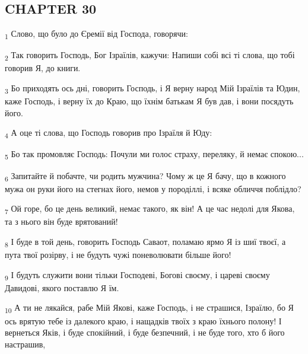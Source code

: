 \subsection{CHAPTER 30}
\begin{tcolorbox}
\textsubscript{1} Слово, що було до Єремії від Господа, говорячи:
\end{tcolorbox}
\begin{tcolorbox}
\textsubscript{2} Так говорить Господь, Бог Ізраїлів, кажучи: Напиши собі всі ті слова, що тобі говорив Я, до книги.
\end{tcolorbox}
\begin{tcolorbox}
\textsubscript{3} Бо приходять ось дні, говорить Господь, і Я верну народ Мій Ізраїлів та Юдин, каже Господь, і верну їх до Краю, що їхнім батькам Я був дав, і вони посядуть його.
\end{tcolorbox}
\begin{tcolorbox}
\textsubscript{4} А оце ті слова, що Господь говорив про Ізраїля й Юду:
\end{tcolorbox}
\begin{tcolorbox}
\textsubscript{5} Бо так промовляє Господь: Почули ми голос страху, переляку, й немає спокою...
\end{tcolorbox}
\begin{tcolorbox}
\textsubscript{6} Запитайте й побачте, чи родить мужчина? Чому ж це Я бачу, що в кожного мужа он руки його на стегнах його, немов у породіллі, і всяке обличчя поблідло?
\end{tcolorbox}
\begin{tcolorbox}
\textsubscript{7} Ой горе, бо це день великий, немає такого, як він! А це час недолі для Якова, та з нього він буде врятований!
\end{tcolorbox}
\begin{tcolorbox}
\textsubscript{8} І буде в той день, говорить Господь Саваот, поламаю ярмо Я із шиї твоєї, а пута твої розірву, і не будуть чужі поневолювати більше його!
\end{tcolorbox}
\begin{tcolorbox}
\textsubscript{9} І будуть служити вони тільки Господеві, Богові своєму, і цареві своєму Давидові, якого поставлю Я їм.
\end{tcolorbox}
\begin{tcolorbox}
\textsubscript{10} А ти не лякайся, рабе Мій Якові, каже Господь, і не страшися, Ізраїлю, бо Я ось врятую тебе із далекого краю, і нащадків твоїх з краю їхнього полону! І вернеться Яків, і буде спокійний, і буде безпечний, і не буде того, хто б його настрашив,
\end{tcolorbox}
